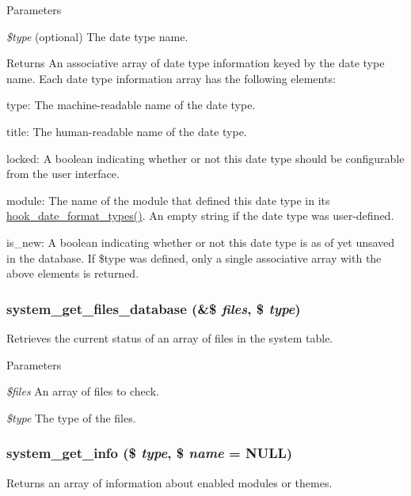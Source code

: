 \begin{DoxyParams}{Parameters}
\item[{\em \$type}](optional) The date type name.\end{DoxyParams}
\begin{DoxyReturn}{Returns}
An associative array of date type information keyed by the date type name. Each date type information array has the following elements:
\begin{DoxyItemize}
\item type: The machine-\/readable name of the date type.
\item title: The human-\/readable name of the date type.
\item locked: A boolean indicating whether or not this date type should be configurable from the user interface.
\item module: The name of the module that defined this date type in its \hyperlink{group__hooks_gaadde7af71d0b4f827cf7aac1c88c4d23}{hook\_\-date\_\-format\_\-types()}. An empty string if the date type was user-\/defined.
\item is\_\-new: A boolean indicating whether or not this date type is as of yet unsaved in the database. If \$type was defined, only a single associative array with the above elements is returned. 
\end{DoxyItemize}
\end{DoxyReturn}
\hypertarget{system_8module_a0851ffa40e4bc737b29677e9b397caac}{
\subsubsection[{system\_\-get\_\-files\_\-database}]{\setlength{\rightskip}{0pt plus 5cm}system\_\-get\_\-files\_\-database (\&\$ {\em files}, \/  \$ {\em type})}}
\label{system_8module_a0851ffa40e4bc737b29677e9b397caac}
Retrieves the current status of an array of files in the system table.


\begin{DoxyParams}{Parameters}
\item[{\em \$files}]An array of files to check. \item[{\em \$type}]The type of the files. \end{DoxyParams}
\hypertarget{system_8module_af54208dab08c482b465a7f10225ebbb7}{
\subsubsection[{system\_\-get\_\-info}]{\setlength{\rightskip}{0pt plus 5cm}system\_\-get\_\-info (\$ {\em type}, \/  \$ {\em name} = {\ttfamily NULL})}}
\label{system_8module_af54208dab08c482b465a7f10225ebbb7}
Returns an array of information about enabled modules or themes.

